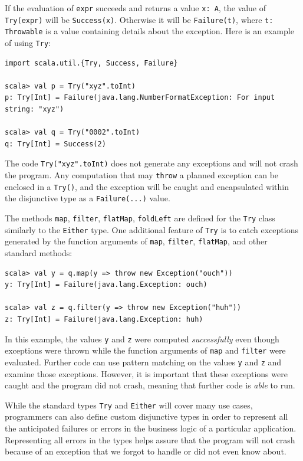 If the evaluation of \lstinline!expr! succeeds and returns a value
\lstinline!x: A!, the value of \lstinline!Try(expr)! will be \lstinline!Success(x)!.
Otherwise it will be \lstinline!Failure(t)!, where \lstinline!t: Throwable!
is a value containing details about the exception. Here is an example
of using \lstinline!Try!:
\begin{lstlisting}
import scala.util.{Try, Success, Failure}

scala> val p = Try("xyz".toInt)
p: Try[Int] = Failure(java.lang.NumberFormatException: For input string: "xyz")

scala> val q = Try("0002".toInt)
q: Try[Int] = Success(2) 
\end{lstlisting}
The code \lstinline!Try("xyz".toInt)! does not generate any exceptions
and will not crash the program. Any computation that may \lstinline!throw!
a planned exception can be enclosed in a \lstinline!Try()!, and the
exception will be caught and encapsulated within the disjunctive type
as a \lstinline!Failure(...)! value.

The methods \lstinline!map!, \lstinline!filter!, \lstinline!flatMap!,
\lstinline!foldLeft! are defined for the \lstinline!Try! class similarly
to the \lstinline!Either! type. One additional feature of \lstinline!Try!
is to catch exceptions generated by the function arguments of \lstinline!map!,
\lstinline!filter!, \lstinline!flatMap!, and other standard methods:
\begin{lstlisting}
scala> val y = q.map(y => throw new Exception("ouch"))
y: Try[Int] = Failure(java.lang.Exception: ouch)

scala> val z = q.filter(y => throw new Exception("huh"))
z: Try[Int] = Failure(java.lang.Exception: huh)
\end{lstlisting}
In this example, the values \lstinline!y! and \lstinline!z! were
computed \emph{successfully} even though exceptions were thrown while
the function arguments of \lstinline!map! and \lstinline!filter!
were evaluated. Further code can use pattern matching on the values
\lstinline!y! and \lstinline!z! and examine those exceptions. However,
it is important that these exceptions were caught and the program
did not crash, meaning that further code is \emph{able} to run. 

While the standard types \lstinline!Try! and \lstinline!Either!
will cover many use cases, programmers can also define custom disjunctive
types in order to represent all the anticipated failures or errors
in the business logic of a particular application. Representing all
errors in the types helps assure that the program will not crash because
of an exception that we forgot to handle or did not even know about.

